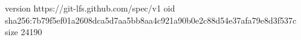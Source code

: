version https://git-lfs.github.com/spec/v1
oid sha256:7b79f5ef01a2608dca5d7aa5bb8aa4c921a90b0e2c88d54e37afa79e8d3f537c
size 24190
